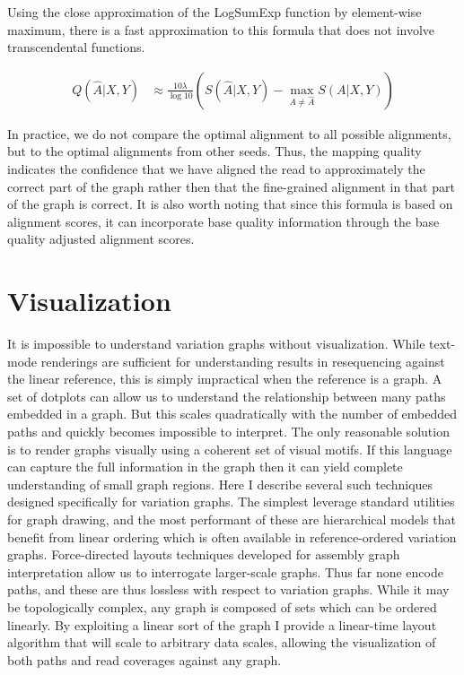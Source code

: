 Using the close approximation of the LogSumExp function by element-wise maximum, there is a fast approximation to this formula that does not involve transcendental functions.

\begin{align}
    Q(\hat A|X,Y) &\approx \frac{10\lambda}{\log 10}\left( S(\hat A | X,Y) - \max_{A \neq \hat A}S(A| X,Y)\right)
\end{align}

In practice, we do not compare the optimal alignment to all possible alignments, but to the optimal alignments from other seeds. Thus, the mapping quality indicates the confidence that we have aligned the read to approximately the correct part of the graph rather then that the fine-grained alignment in that part of the graph is correct. It is also worth noting that since this formula is based on alignment scores, it can incorporate base quality information through the base quality adjusted alignment scores.


\section{Visualization}

It is impossible to understand variation graphs without visualization.
While text-mode renderings are sufficient for understanding results in resequencing against the linear reference, this is simply impractical when the reference is a graph.
A set of dotplots can allow us to understand the relationship between many paths embedded in a graph.
But this scales quadratically with the number of embedded paths and quickly becomes impossible to interpret.
The only reasonable solution is to render graphs visually using a coherent set of visual motifs.
If this language can capture the full information in the graph then it can yield complete understanding of small graph regions.
Here I describe several such techniques designed specifically for variation graphs.
The simplest leverage standard utilities for graph drawing, and the most performant of these are hierarchical models that benefit from linear ordering which is often available in reference-ordered variation graphs.
Force-directed layouts techniques developed for assembly graph interpretation allow us to interrogate larger-scale graphs.
Thus far none encode paths, and these are thus lossless with respect to variation graphs.
While it may be topologically complex, any graph is composed of sets which can be ordered linearly.
By exploiting a linear sort of the graph I provide a linear-time layout algorithm that will scale to arbitrary data scales, allowing the visualization of both paths and read coverages against any graph.

